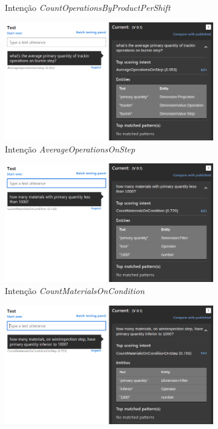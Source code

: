 \begin{figure}[!ht]
\begin{subfigure}{.48\textwidth}
        \caption{Intenção \textit{CountOperationsByProductPerShift}}
     \end{subfigure}
     \begin{subfigure}{.48\textwidth}
        \centering
        \includegraphics[width=\textwidth]{appendices/assets/nlcomprehension04.png}
        \caption{Intenção \textit{AverageOperationsOnStep}}
     \end{subfigure}
     \bigbreak
     \begin{subfigure}{.48\textwidth}
        \centering
        \includegraphics[width=\textwidth]{appendices/assets/nlcomprehension05.png}
        \caption{Intenção \textit{CountMaterialsOnCondition}}
     \end{subfigure}
     \begin{subfigure}{.48\textwidth}
        \centering
        \includegraphics[width=\textwidth]{appendices/assets/nlcomprehension06.png}

\end{subfigure}
\end{figure}
